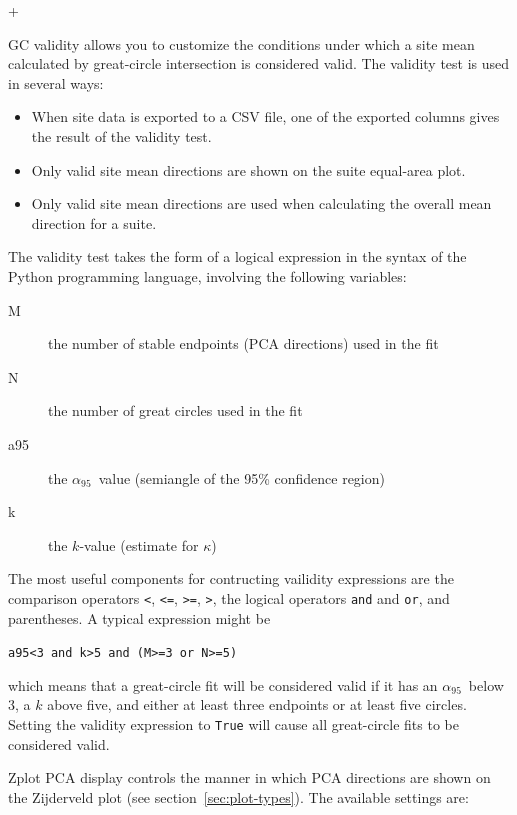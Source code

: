 \documentclass[a4paper,british]{article}
\newcommand{\menuitemlabel}[1]{%
\mbox{\textsf{#1}}\hfil}
\newenvironment{menuitemlist}%
{\begin{list}{}{%
\renewcommand{\makelabel}{\menuitemlabel}%
\setlength{\labelwidth}{35pt}%
\setlength{\leftmargin}%
             {\labelwidth+\labelsep}}}%
{\end{list}}
\newcommand{\caps}[1]{\MakeTextUppercase{#1}} %
\newcommand{\alnifi}{$\alpha_{95}$}
\begin{document}
\begin{menuitemlist}
\item[GC validity] allows you to customize the conditions under which a site
  mean calculated by great-circle intersection is considered valid. The
  validity test is used in several ways:

  \begin{itemize}

    \item When site data is exported to a CSV file, one of the exported
      columns gives the result of the validity test.

    \item Only valid site mean directions are shown on the suite equal-area
      plot.

    \item Only valid site mean directions are used when calculating the
      overall mean direction for a suite.

  \end{itemize}

  The validity test takes the form of a logical expression in the syntax of
  the Python programming language, involving the following variables:

\begin{description}
  \item[M] the number of stable endpoints (\caps{pca} directions) used in the fit
  \item[N] the number of great circles used in the fit
  \item[a95] the \alnifi\ value (semiangle of the 95\% confidence region)
  \item[k] the $k$-value (estimate for $\kappa$)
\end{description}

The most useful components for contructing vailidity expressions are the
comparison operators \texttt{<}, \texttt{<=}, \texttt{>=}, \texttt{>}, the
logical operators \texttt{and} and \texttt{or}, and parentheses. A typical
expression might be

\centerline{\texttt{a95<3 and k>5 and (M>=3 or N>=5)}}

which means that a great-circle fit will be considered valid if it has an
\alnifi\ below 3, a $k$ above five, and either at least three endpoints or
at least five circles. Setting the validity expression to \texttt{True}
will cause all great-circle fits to be considered valid.

\item[Zplot \caps{pca} display] controls the manner in which \caps{pca} directions are
  shown on the Zijderveld plot (see section~\ref{sec:plot-types}). The
  available settings are:


\end{menuitemlist}
\end{document}
